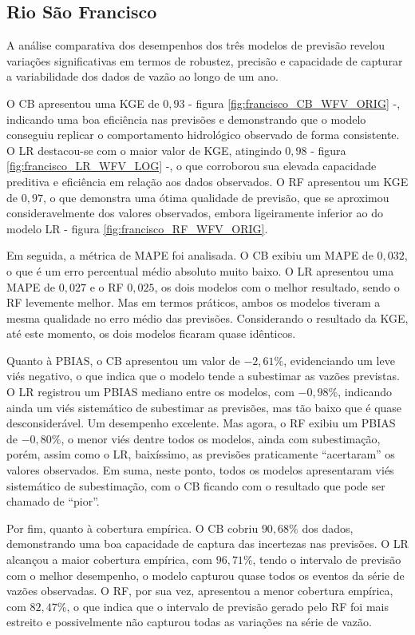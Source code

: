 \subsection{Rio São Francisco}

A análise comparativa dos desempenhos dos três modelos de previsão revelou variações significativas em termos de robustez, precisão e capacidade de capturar a variabilidade dos dados de vazão ao longo de um ano.

O CB apresentou uma KGE de $0,93$ - figura \ref{fig:francisco_CB_WFV_ORIG} -, indicando uma boa eficiência nas previsões e demonstrando que o modelo conseguiu replicar o comportamento hidrológico observado de forma consistente. O LR destacou-se com o maior valor de KGE, atingindo $0,98$ - figura \ref{fig:francisco_LR_WFV_LOG} -, o que corroborou sua elevada capacidade preditiva e eficiência em relação aos dados observados. O RF apresentou um KGE de $0,97$, o que demonstra uma ótima qualidade de previsão, que se aproximou consideravelmente dos valores observados, embora ligeiramente inferior ao do modelo LR - figura \ref{fig:francisco_RF_WFV_ORIG}.

Em seguida, a métrica de MAPE foi analisada. O CB exibiu um MAPE de $0,032$, o que é um erro percentual médio absoluto muito baixo. O LR apresentou uma MAPE de $0,027$ e o RF $0,025$, os dois modelos com o melhor resultado, sendo o RF levemente melhor. Mas em termos práticos, ambos os modelos tiveram a mesma qualidade no erro médio das previsões. Considerando o resultado da KGE, até este momento, os dois modelos ficaram quase idênticos.

Quanto à PBIAS, o CB apresentou um valor de $-2,61\%$, evidenciando um leve viés negativo, o que indica que o modelo tende a subestimar as vazões previstas. O LR registrou um PBIAS mediano entre os modelos, com $-0,98\%$, indicando ainda um viés sistemático de subestimar as previsões, mas tão baixo que é quase desconsiderável. Um desempenho excelente. Mas agora, o RF exibiu um PBIAS de $-0,80\%$, o menor viés dentre todos os modelos, ainda com subestimação, porém, assim como o LR, baixíssimo, as previsões praticamente ``acertaram'' os valores observados. Em suma, neste ponto, todos os modelos apresentaram viés sistemático de subestimação, com o CB ficando com o resultado que pode ser chamado de ``pior''.

Por fim, quanto à cobertura empírica. O CB cobriu $90,68\%$ dos dados, demonstrando uma boa capacidade de captura das incertezas nas previsões. O LR alcançou a maior cobertura empírica, com $96,71\%$, tendo o intervalo de previsão com o melhor desempenho, o modelo capturou quase todos os eventos da série de vazões observadas. O RF, por sua vez, apresentou a menor cobertura empírica, com $82,47\%$, o que indica que o intervalo de previsão gerado pelo RF foi mais estreito e possivelmente não capturou todas as variações na série de vazão.

